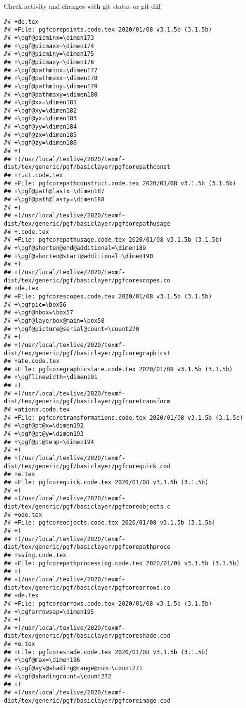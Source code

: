 \documentclass[ignorenonframetext,]{beamer}
\begin{document}
\begin{frame}[fragile]{Check activity and changes with git status or git
diff}
\begin{verbatim}
## +de.tex
## +File: pgfcorepoints.code.tex 2020/01/08 v3.1.5b (3.1.5b)
## +\pgf@picminx=\dimen173
## +\pgf@picmaxx=\dimen174
## +\pgf@picminy=\dimen175
## +\pgf@picmaxy=\dimen176
## +\pgf@pathminx=\dimen177
## +\pgf@pathmaxx=\dimen178
## +\pgf@pathminy=\dimen179
## +\pgf@pathmaxy=\dimen180
## +\pgf@xx=\dimen181
## +\pgf@xy=\dimen182
## +\pgf@yx=\dimen183
## +\pgf@yy=\dimen184
## +\pgf@zx=\dimen185
## +\pgf@zy=\dimen186
## +)
## +(/usr/local/texlive/2020/texmf-dist/tex/generic/pgf/basiclayer/pgfcorepathconst
## +ruct.code.tex
## +File: pgfcorepathconstruct.code.tex 2020/01/08 v3.1.5b (3.1.5b)
## +\pgf@path@lastx=\dimen187
## +\pgf@path@lasty=\dimen188
## +)
## +(/usr/local/texlive/2020/texmf-dist/tex/generic/pgf/basiclayer/pgfcorepathusage
## +.code.tex
## +File: pgfcorepathusage.code.tex 2020/01/08 v3.1.5b (3.1.5b)
## +\pgf@shorten@end@additional=\dimen189
## +\pgf@shorten@start@additional=\dimen190
## +)
## +(/usr/local/texlive/2020/texmf-dist/tex/generic/pgf/basiclayer/pgfcorescopes.co
## +de.tex
## +File: pgfcorescopes.code.tex 2020/01/08 v3.1.5b (3.1.5b)
## +\pgfpic=\box56
## +\pgf@hbox=\box57
## +\pgf@layerbox@main=\box58
## +\pgf@picture@serial@count=\count270
## +)
## +(/usr/local/texlive/2020/texmf-dist/tex/generic/pgf/basiclayer/pgfcoregraphicst
## +ate.code.tex
## +File: pgfcoregraphicstate.code.tex 2020/01/08 v3.1.5b (3.1.5b)
## +\pgflinewidth=\dimen191
## +)
## +(/usr/local/texlive/2020/texmf-dist/tex/generic/pgf/basiclayer/pgfcoretransform
## +ations.code.tex
## +File: pgfcoretransformations.code.tex 2020/01/08 v3.1.5b (3.1.5b)
## +\pgf@pt@x=\dimen192
## +\pgf@pt@y=\dimen193
## +\pgf@pt@temp=\dimen194
## +)
## +(/usr/local/texlive/2020/texmf-dist/tex/generic/pgf/basiclayer/pgfcorequick.cod
## +e.tex
## +File: pgfcorequick.code.tex 2020/01/08 v3.1.5b (3.1.5b)
## +)
## +(/usr/local/texlive/2020/texmf-dist/tex/generic/pgf/basiclayer/pgfcoreobjects.c
## +ode.tex
## +File: pgfcoreobjects.code.tex 2020/01/08 v3.1.5b (3.1.5b)
## +)
## +(/usr/local/texlive/2020/texmf-dist/tex/generic/pgf/basiclayer/pgfcorepathproce
## +ssing.code.tex
## +File: pgfcorepathprocessing.code.tex 2020/01/08 v3.1.5b (3.1.5b)
## +)
## +(/usr/local/texlive/2020/texmf-dist/tex/generic/pgf/basiclayer/pgfcorearrows.co
## +de.tex
## +File: pgfcorearrows.code.tex 2020/01/08 v3.1.5b (3.1.5b)
## +\pgfarrowsep=\dimen195
## +)
## +(/usr/local/texlive/2020/texmf-dist/tex/generic/pgf/basiclayer/pgfcoreshade.cod
## +e.tex
## +File: pgfcoreshade.code.tex 2020/01/08 v3.1.5b (3.1.5b)
## +\pgf@max=\dimen196
## +\pgf@sys@shading@range@num=\count271
## +\pgf@shadingcount=\count272
## +)
## +(/usr/local/texlive/2020/texmf-dist/tex/generic/pgf/basiclayer/pgfcoreimage.cod

\end{verbatim}
\end{frame}
\end{document}
